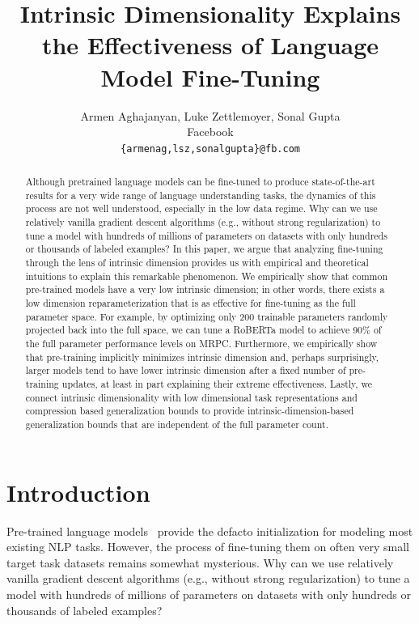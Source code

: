 \documentclass{article} %
\title{Intrinsic Dimensionality Explains the Effectiveness of Language Model Fine-Tuning}
\author{Armen Aghajanyan, Luke Zettlemoyer, Sonal Gupta \\
Facebook\\
\texttt{\{armenag,lsz,sonalgupta\}@fb.com} \\
}
\begin{document}
\maketitle

\begin{abstract}
Although pretrained language models can be fine-tuned to produce state-of-the-art results for a very wide range of language understanding tasks, the dynamics of this process are not well understood, especially in the low data regime. Why can we use relatively vanilla gradient descent algorithms (e.g., without strong regularization) to tune a model with hundreds of millions of parameters on datasets with only hundreds or thousands of labeled examples? 
In this paper, we argue that analyzing fine-tuning through the lens of intrinsic dimension provides us with empirical and theoretical intuitions to explain this remarkable phenomenon. We empirically show that common pre-trained models have a very low intrinsic dimension; 
in other words, there exists a low dimension reparameterization that is as effective for fine-tuning as the full parameter space.  
For example, by optimizing only 200 trainable parameters randomly projected back into the full space, we can tune a RoBERTa model to achieve 90\% of the full parameter performance levels on MRPC. Furthermore, we empirically show that pre-training implicitly minimizes intrinsic dimension and, perhaps surprisingly, larger models tend to have lower intrinsic dimension after a fixed number of pre-training updates, at least in part explaining their extreme effectiveness. 
Lastly, we connect intrinsic dimensionality with low dimensional task representations and compression based generalization bounds to provide intrinsic-dimension-based generalization bounds that are independent of the full parameter count.
\end{abstract}

\section{Introduction}
Pre-trained language models~\citep{GPT, BERT, ROBERTA, BART,MARGE}  provide the defacto initialization for modeling most existing NLP tasks. However, the process of fine-tuning them on often very small target task datasets remains somewhat mysterious. Why can we use relatively vanilla gradient descent algorithms (e.g., without strong regularization) to tune a model with hundreds of millions of parameters on datasets with only hundreds or thousands of labeled examples?  
\end{document}
